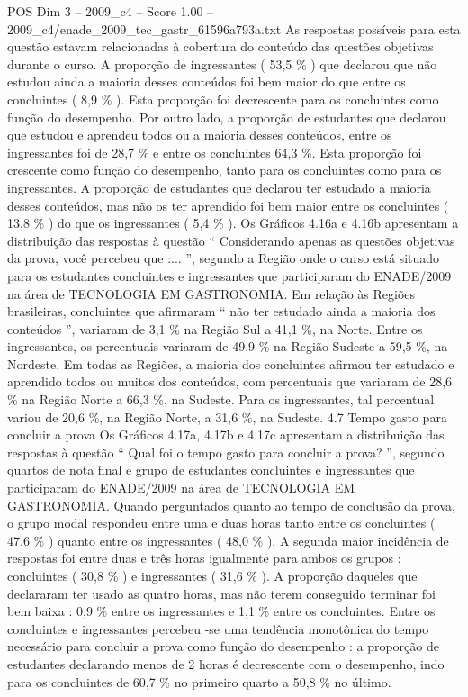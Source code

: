 \begin{textsample}{POS Dim 3 – 2009\_c4 – Score 1.00 – 2009\_c4/enade\_2009\_tec\_gastr\_61596a793a.txt}
As respostas possíveis para esta questão estavam relacionadas à cobertura do conteúdo das questões objetivas durante o curso.
A proporção de ingressantes ( 53,5 \% ) que declarou que não estudou ainda a maioria desses conteúdos foi bem maior do que entre os concluintes ( 8,9 \% ).
Esta proporção foi decrescente para os concluintes como função do desempenho.
Por outro lado, a proporção de estudantes que declarou que estudou e aprendeu todos ou a maioria desses conteúdos, entre os ingressantes foi de 28,7 \% e entre os concluintes 64,3 \%.
Esta proporção foi crescente como função do desempenho, tanto para os concluintes como para os ingressantes.
A proporção de estudantes que declarou ter estudado a maioria desses conteúdos, mas não os ter aprendido foi bem maior entre os concluintes ( 13,8 \% ) do que os ingressantes ( 5,4 \% ).
Os Gráficos 4.16a e 4.16b apresentam a distribuição das respostas à questão “ Considerando apenas as questões objetivas da prova, você percebeu que :... ”, segundo a Região onde o curso está situado para os estudantes concluintes e ingressantes que participaram do ENADE/2009 na área de TECNOLOGIA EM GASTRONOMIA.
Em relação às Regiões brasileiras, concluintes que afirmaram “ não ter estudado ainda a maioria dos conteúdos ”, variaram de 3,1 \% na Região Sul a 41,1 \%, na Norte.
Entre os ingressantes, os percentuais variaram de 49,9 \% na Região Sudeste a 59,5 \%, na Nordeste.
Em todas as Regiões, a maioria dos concluintes afirmou ter estudado e aprendido todos ou muitos dos conteúdos, com percentuais que variaram de 28,6 \% na Região Norte a 66,3 \%, na Sudeste.
Para os ingressantes, tal percentual variou de 20,6 \%, na Região Norte, a 31,6 \%, na Sudeste. 4.7 Tempo gasto para concluir a prova Os Gráficos 4.17a, 4.17b e 4.17c apresentam a distribuição das respostas à questão “ Qual foi o tempo gasto para concluir a prova? ”, segundo quartos de nota final e grupo de estudantes concluintes e ingressantes que participaram do ENADE/2009 na área de TECNOLOGIA EM GASTRONOMIA.
Quando perguntados quanto ao tempo de conclusão da prova, o grupo modal respondeu entre uma e duas horas tanto entre os concluintes ( 47,6 \% ) quanto entre os ingressantes ( 48,0 \% ).
A segunda maior incidência de respostas foi entre duas e três horas igualmente para ambos os grupos : concluintes ( 30,8 \% ) e ingressantes ( 31,6 \% ).
A proporção daqueles que declararam ter usado as quatro horas, mas não terem conseguido terminar foi bem baixa : 0,9 \% entre os ingressantes e 1,1 \% entre os concluintes.
Entre os concluintes e ingressantes percebeu -se uma tendência monotônica do tempo necessário para concluir a prova como função do desempenho : a proporção de estudantes declarando menos de 2 horas é decrescente com o desempenho, indo para os concluintes de 60,7 \% no primeiro quarto a 50,8 \% no último.

\end{textsample}
